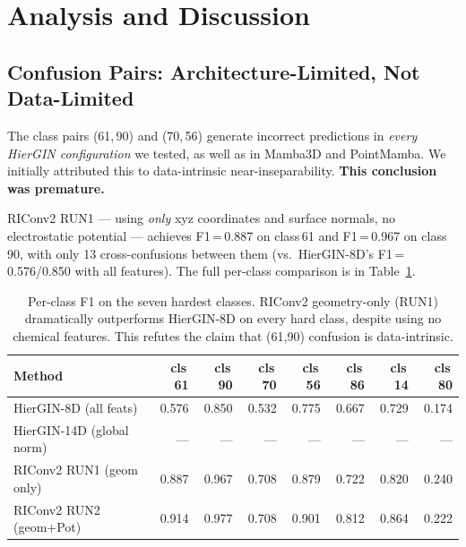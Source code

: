 \section{Analysis and Discussion}
\label{sec:discussion}

\subsection{Confusion Pairs: Architecture-Limited, Not Data-Limited}
\label{sec:discussion:confusion}

The class pairs (61,\,90) and (70,\,56) generate incorrect predictions in
\textit{every HierGIN configuration} we tested, as well as in Mamba3D and
PointMamba.
We initially attributed this to data-intrinsic near-inseparability.
\textbf{This conclusion was premature.}

RIConv2 RUN1 --- using \emph{only} xyz coordinates and surface normals, no
electrostatic potential --- achieves F1\,=\,0.887 on class\,61 and
F1\,=\,0.967 on class\,90, with only 13 cross-confusions between them
(vs.\ HierGIN-8D's F1\,=\,0.576/0.850 with all features).
The full per-class comparison is in Table~\ref{tab:per_class_riconv}.

\begin{table}[h]
  \centering
  \caption{Per-class F1 on the seven hardest classes.
           RIConv2 geometry-only (RUN1) dramatically outperforms HierGIN-8D
           on every hard class, despite using no chemical features.
           This refutes the claim that (61,90) confusion is data-intrinsic.}
  \label{tab:per_class_riconv}
  \begin{tabular}{lrrrrrrr}
    \toprule
    \textbf{Method} & \textbf{cls\,61} & \textbf{cls\,90} & \textbf{cls\,70}
      & \textbf{cls\,56} & \textbf{cls\,86} & \textbf{cls\,14} & \textbf{cls\,80} \\
    \midrule
    HierGIN-8D (all feats)     & 0.576 & 0.850 & 0.532 & 0.775 & 0.667 & 0.729 & 0.174 \\
    HierGIN-14D (global norm)  & ---   & ---   & ---   & ---   & ---   & ---   & ---   \\
    \midrule
    RIConv2 RUN1 (geom only)   & 0.887 & 0.967 & 0.708 & 0.879 & 0.722 & 0.820 & 0.240 \\
    RIConv2 RUN2 (geom+Pot)    & 0.914 & 0.977 & 0.708 & 0.901 & 0.812 & 0.864 & 0.222 \\
    \bottomrule
  \end{tabular}
\end{table}


